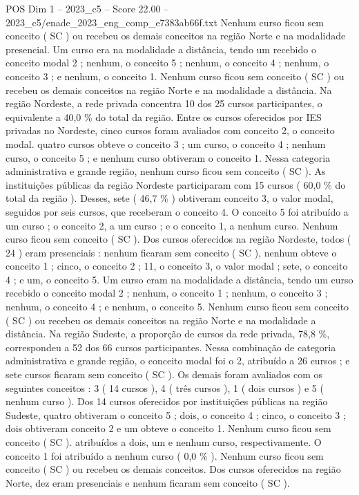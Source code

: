 \begin{textsample}{POS Dim 1 – 2023\_c5 – Score 22.00 – 2023\_c5/enade\_2023\_eng\_comp\_e7383ab66f.txt}
Nenhum curso ficou sem conceito ( SC ) ou recebeu os demais conceitos na região Norte e na modalidade presencial.
Um curso era na modalidade a distância, tendo um recebido o conceito modal 2 ; nenhum, o conceito 5 ; nenhum, o conceito 4 ; nenhum, o conceito 3 ; e nenhum, o conceito 1.
Nenhum curso ficou sem conceito ( SC ) ou recebeu os demais conceitos na região Norte e na modalidade a distância.
Na região Nordeste, a rede privada concentra 10 dos 25 cursos participantes, o equivalente a 40,0 \% do total da região.
Entre os cursos oferecidos por IES privadas no Nordeste, cinco cursos foram avaliados com conceito 2, o conceito modal. quatro cursos obteve o conceito 3 ; um curso, o conceito 4 ; nenhum curso, o conceito 5 ; e nenhum curso obtiveram o conceito 1.
Nessa categoria administrativa e grande região, nenhum curso ficou sem conceito ( SC ).
As instituições públicas da região Nordeste participaram com 15 cursos ( 60,0 \% do total da região ).
Desses, sete ( 46,7 \% ) obtiveram conceito 3, o valor modal, seguidos por seis cursos, que receberam o conceito 4.
O conceito 5 foi atribuído a um curso ; o conceito 2, a um curso ; e o conceito 1, a nenhum curso.
Nenhum curso ficou sem conceito ( SC ).
Dos cursos oferecidos na região Nordeste, todos ( 24 ) eram presenciais : nenhum ficaram sem conceito ( SC ), nenhum obteve o conceito 1 ; cinco, o conceito 2 ; 11, o conceito 3, o valor modal ; sete, o conceito 4 ; e um, o conceito 5.
Um curso eram na modalidade a distância, tendo um curso recebido o conceito modal 2 ; nenhum, o conceito 1 ; nenhum, o conceito 3 ; nenhum, o conceito 4 ; e nenhum, o conceito 5.
Nenhum curso ficou sem conceito ( SC ) ou recebeu os demais conceitos na região Norte e na modalidade a distância.
Na região Sudeste, a proporção de cursos da rede privada, 78,8 \%, correspondeu a 52 dos 66 cursos participantes.
Nessa combinação de categoria administrativa e grande região, o conceito modal foi o 2, atribuído a 26 cursos ; e sete cursos ficaram sem conceito ( SC ).
Os demais foram avaliados com os seguintes conceitos : 3 ( 14 cursos ), 4 ( três cursos ), 1 ( dois cursos ) e 5 ( nenhum curso ).
Dos 14 cursos oferecidos por instituições públicas na região Sudeste, quatro obtiveram o conceito 5 ; dois, o conceito 4 ; cinco, o conceito 3 ; dois obtiveram conceito 2 e um obteve o conceito 1.
Nenhum curso ficou sem conceito ( SC ). atribuídos a dois, um e nenhum curso, respectivamente.
O conceito 1 foi atribuído a nenhum curso ( 0,0 \% ).
Nenhum curso ficou sem conceito ( SC ) ou recebeu os demais conceitos.
Dos cursos oferecidos na região Norte, dez eram presenciais e nenhum ficaram sem conceito ( SC ).

\end{textsample}
